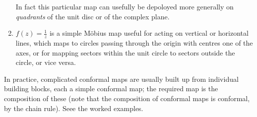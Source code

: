 \documentclass[a4paper]{article}
\begin{document}
\begin{eg}
\begin{enumerate}
    In fact this particular map can usefully be depoloyed more generally on \emph{quadrants} of the unit disc or of the complex plane.
  \item \(f(z) = \frac{1}{z}\) is a simple Möbius map useful for acting on vertical or horizontal lines, which maps to circles passing through the origin with centres one of the axes, or for mapping sectors within the unit circle to sectors outside the circle, or vice versa.
  \end{enumerate}
\end{eg}

In practice, complicated conformal maps are usually built up from individual building blocks, each a simple conformal map; the required map is the composition of these (note that the composition of conformal maps is conformal, by the chain rule). Seee the worked examples.
\end{document}
